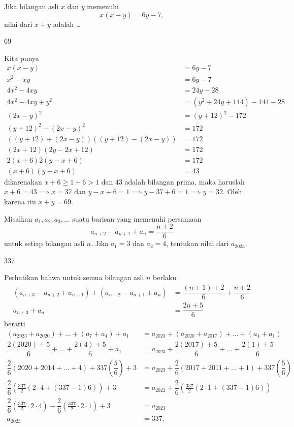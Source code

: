 \begin{soalbaru}
Jika bilangan asli $x$ dan $y$ memenuhi
$$x(x-y)=6y-7,$$
nilai dari $x+y$ adalah \dots
\end{soalbaru}
\begin{jawaban}
69
\end{jawaban}
\begin{solusi}
Kita punya
\begin{align*}
x(x-y)&=6y-7\\
x^2-xy &= 6y - 7\\
4x^2 - 4xy &= 24y - 28\\
4x^2 - 4xy + y^2 &= (y^2 + 24y + 144) - 144 - 28\\
(2x-y)^2 &= (y+12)^2 - 172\\
(y+12)^2-(2x-y)^2 &= 172\\
((y+12)+(2x-y))((y+12)-(2x-y)) &= 172\\
(2x+12)(2y-2x+12) &= 172\\
2(x+6)2(y-x+6) &= 172\\
(x+6)(y-x+6) &= 43
\end{align*}
dikarenakan $x+6 \ge 1+6 > 1$ dan $43$ adalah bilangan prima, maka haruslah $x+6 = 43 \implies x = 37$ dan $y-x+6=1 \implies y-37+6=1 \implies y = 32$. Oleh karena itu $x+y = \boxed{69}$.
\end{solusi}

\begin{soalbaru}
Misalkan $a_1,a_2,a_3,\dots$ suatu barisan yang memenuhi persamaan
$$a_{n+2}-a_{n+1}+a_{n}=\dfrac{n+2}{6}$$
untuk setiap bilangan asli $n$. Jika $a_1=3$ dan $a_2=4$, tentukan nilai dari $a_{2023}$.
\end{soalbaru}
\begin{jawaban}
337
\end{jawaban}
\begin{solusi}
Perhatikan bahwa untuk semua bilangan asli $n$ berlaku
\begin{align*}
(a_{n+3}-a_{n+2}+a_{n+1})+(a_{n+2}-a_{n+1}+a_{n})&=\dfrac{(n+1)+2}{6}+\dfrac{n+2}{6}\\
a_{n+3}+a_{n} &= \dfrac{2n+5}{6}
\end{align*}
berarti
\begin{align*}
(a_{2023}+a_{2020})+\dots+(a_7+a_4)+a_1 &= a_{2023}+(a_{2020}+a_{2017})+\dots+(a_4+a_1) \\
\dfrac{2(2020)+5}{6}+\dots+\dfrac{2(4)+5}{6} + a_1 &= a_{2023}+\dfrac{2(2017)+5}{6}+\dots+\dfrac{2(1)+5}{6}\\
\dfrac{2}{6}(2020+2014+\dots+4) + 337\left(\dfrac{5}{6}\right)+3&= a_{2023} + \dfrac{2}{6}(2017+2011+\dots+1) + 337\left(\dfrac{5}{6}\right)\\
\dfrac{2}{6}\left(\frac{337}{2}(2\cdot 4 + (337-1)6)\right) + 3 &= a_{2023} + \dfrac{2}{6}\left(\frac{337}{2}(2\cdot 1 + (337-1)6)\right) \\
\dfrac{2}{6}\left(\frac{337}{2}\cdot 2\cdot 4\right)-\dfrac{2}{6}\left(\frac{337}{2}\cdot 2\cdot 1\right)+3 &= a_{2023}\\
a_{2023} &= \boxed{337}.
\end{align*}
\end{solusi}

